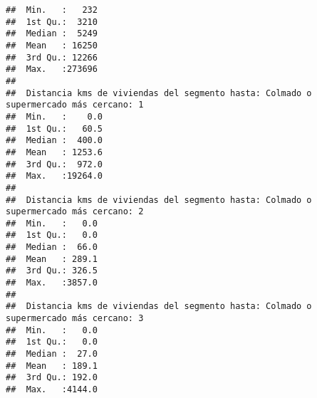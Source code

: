\documentclass[11pt,]{article}
\begin{document}
\begin{verbatim}
##  Min.   :   232                                                                      
##  1st Qu.:  3210                                                                      
##  Median :  5249                                                                      
##  Mean   : 16250                                                                      
##  3rd Qu.: 12266                                                                      
##  Max.   :273696                                                                      
##                                                                                      
##  Distancia kms de viviendas del segmento hasta: Colmado o supermercado más cercano: 1
##  Min.   :    0.0                                                                     
##  1st Qu.:   60.5                                                                     
##  Median :  400.0                                                                     
##  Mean   : 1253.6                                                                     
##  3rd Qu.:  972.0                                                                     
##  Max.   :19264.0                                                                     
##                                                                                      
##  Distancia kms de viviendas del segmento hasta: Colmado o supermercado más cercano: 2
##  Min.   :   0.0                                                                      
##  1st Qu.:   0.0                                                                      
##  Median :  66.0                                                                      
##  Mean   : 289.1                                                                      
##  3rd Qu.: 326.5                                                                      
##  Max.   :3857.0                                                                      
##                                                                                      
##  Distancia kms de viviendas del segmento hasta: Colmado o supermercado más cercano: 3
##  Min.   :   0.0                                                                      
##  1st Qu.:   0.0                                                                      
##  Median :  27.0                                                                      
##  Mean   : 189.1                                                                      
##  3rd Qu.: 192.0                                                                      
##  Max.   :4144.0                                                                      

\end{verbatim}
\end{document}
